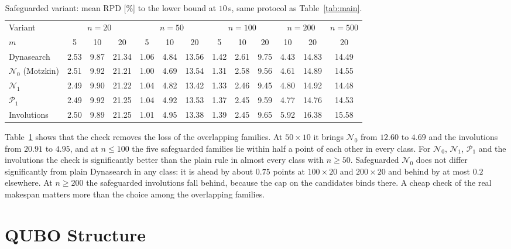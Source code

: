 \documentclass[10pt,twocolumn]{article}
\newcommand{\N}{\mathcal{N}}
\newcommand{\Pa}{\mathcal{P}}
\begin{document}
\begin{table}[t]
\centering
\caption{Safeguarded variant: mean RPD [\%] to the lower bound at
$10$\,s, same protocol as Table~\ref{tab:main}.}
\label{tab:safe}
\small
\begin{tabular}{@{}l*{12}{c}@{}}
\toprule
Variant & \multicolumn{3}{c}{$n=20$} & \multicolumn{3}{c}{$n=50$} &
\multicolumn{3}{c}{$n=100$} & \multicolumn{2}{c}{$n=200$} & $n=500$ \\
$m$ & 5 & 10 & 20 & 5 & 10 & 20 & 5 & 10 & 20 & 10 & 20 & 20 \\
\midrule
Dynasearch & 2.53 & 9.87 & 21.34 & 1.06 & 4.84 & 13.56 & 1.42 & 2.61 & 9.75 & 4.43 & 14.83 & 14.49 \\
$\N_0$ (Motzkin) & 2.51 & 9.92 & 21.21 & 1.00 & 4.69 & 13.54 & 1.31 & 2.58 & 9.56 & 4.61 & 14.89 & 14.55 \\
$\N_1$ & 2.49 & 9.90 & 21.22 & 1.04 & 4.82 & 13.42 & 1.33 & 2.46 & 9.45 & 4.80 & 14.92 & 14.48 \\
$\Pa_1$ & 2.49 & 9.92 & 21.25 & 1.04 & 4.92 & 13.53 & 1.37 & 2.45 & 9.59 & 4.77 & 14.76 & 14.53 \\
Involutions & 2.50 & 9.89 & 21.25 & 1.01 & 4.95 & 13.38 & 1.39 & 2.45 & 9.65 & 5.92 & 16.38 & 15.58 \\
\bottomrule
\end{tabular}
\end{table}

Table~\ref{tab:safe} shows that the check removes the loss of the
overlapping families. At $50\times10$ it brings $\N_0$ from $12.60$ to
$4.69$ and the involutions from $20.91$ to $4.95$, and at $n\leq100$
the five safeguarded families lie within half a point of each other in
every class. For $\N_0$, $\N_1$, $\Pa_1$ and the involutions the check
is significantly better than the plain rule in almost every class with
$n\geq50$. Safeguarded $\N_0$ does not differ significantly from plain
Dynasearch in any class: it is ahead by about $0.75$ points at
$100\times20$ and $200\times20$ and behind by at most $0.2$ elsewhere.
At $n\geq200$ the safeguarded involutions fall behind, because the cap
on the candidates binds there. A cheap check of the real makespan
matters more than the choice among the overlapping families.

\section{QUBO Structure}\label{sec:quantum}
\end{document}

